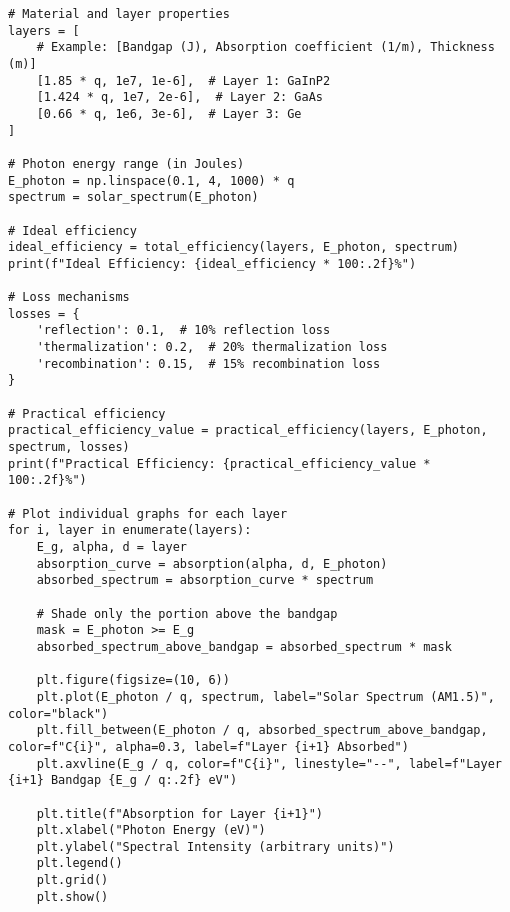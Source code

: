 \documentclass[11pt]{article}
\begin{document}
\begin{lstlisting}[style=custompython, caption=Python Code for Solar Cell Efficiency Simulator]
# Material and layer properties
layers = [
    # Example: [Bandgap (J), Absorption coefficient (1/m), Thickness (m)]
    [1.85 * q, 1e7, 1e-6],  # Layer 1: GaInP2
    [1.424 * q, 1e7, 2e-6],  # Layer 2: GaAs
    [0.66 * q, 1e6, 3e-6],  # Layer 3: Ge
]

# Photon energy range (in Joules)
E_photon = np.linspace(0.1, 4, 1000) * q
spectrum = solar_spectrum(E_photon)

# Ideal efficiency
ideal_efficiency = total_efficiency(layers, E_photon, spectrum)
print(f"Ideal Efficiency: {ideal_efficiency * 100:.2f}%")

# Loss mechanisms
losses = {
    'reflection': 0.1,  # 10% reflection loss
    'thermalization': 0.2,  # 20% thermalization loss
    'recombination': 0.15,  # 15% recombination loss
}

# Practical efficiency
practical_efficiency_value = practical_efficiency(layers, E_photon, spectrum, losses)
print(f"Practical Efficiency: {practical_efficiency_value * 100:.2f}%")

# Plot individual graphs for each layer
for i, layer in enumerate(layers):
    E_g, alpha, d = layer
    absorption_curve = absorption(alpha, d, E_photon)
    absorbed_spectrum = absorption_curve * spectrum
    
    # Shade only the portion above the bandgap
    mask = E_photon >= E_g
    absorbed_spectrum_above_bandgap = absorbed_spectrum * mask

    plt.figure(figsize=(10, 6))
    plt.plot(E_photon / q, spectrum, label="Solar Spectrum (AM1.5)", color="black")
    plt.fill_between(E_photon / q, absorbed_spectrum_above_bandgap, color=f"C{i}", alpha=0.3, label=f"Layer {i+1} Absorbed")
    plt.axvline(E_g / q, color=f"C{i}", linestyle="--", label=f"Layer {i+1} Bandgap {E_g / q:.2f} eV")

    plt.title(f"Absorption for Layer {i+1}")
    plt.xlabel("Photon Energy (eV)")
    plt.ylabel("Spectral Intensity (arbitrary units)")
    plt.legend()
    plt.grid()
    plt.show()

\end{lstlisting}
\newpage
\end{document}
